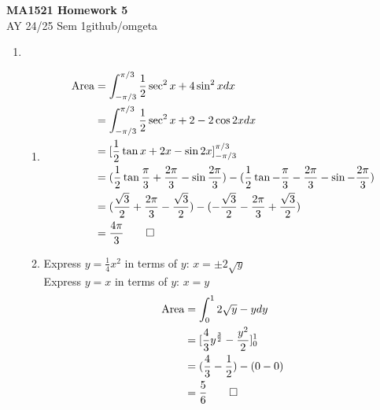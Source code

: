 \documentclass[12pt, a4paper]{article}
\newcommand{\mytitle}{MA1521 Homework 5}
\newcommand{\myauthor}{github/omgeta}
\newcommand{\mydate}{AY 24/25 Sem 1}
\begin{document}
\raggedright
\footnotesize
\begin{center}
{\normalsize{\textbf{\mytitle}}} \\
{\footnotesize{\mydate\hspace{2pt}\textemdash\hspace{2pt}\myauthor}}
\end{center}

\begin{enumerate}[Q\arabic*.]
  \item 
    \begin{enumerate}[(\alph*)]
      \item 
        \begin{align*}
          \text{Area} &= \int^{\pi/3}_{-\pi/3} \frac{1}{2}\sec^2x + 4\sin^2x dx\\
                      &= \int^{\pi/3}_{-\pi/3} \frac{1}{2}\sec^2x + 2 - 2\cos2x dx\\
                      &= [\frac{1}{2}\tan x + 2x - \sin 2x]^{\pi/3}_{-\pi/3}\\
                      &= (\frac{1}{2}\tan \frac{\pi}{3} + \frac{2\pi}{3} - \sin \frac{2\pi}{3}) - (\frac{1}{2}\tan -\frac{\pi}{3} - \frac{2\pi}{3} - \sin -\frac{2\pi}{3})\\
                      &= (\frac{\sqrt{3}}{2} + \frac{2\pi}{3} - \frac{\sqrt{3}}{2}) - (-\frac{\sqrt{3}}{2} - \frac{2\pi}{3} + \frac{\sqrt{3}}{2})\\
                      &= \frac{4\pi}{3} \qed
        \end{align*}

      \item Express $y=\frac{1}{4}x^2$ in terms of $y$: $x = \pm2\sqrt{y}$\\
        Express $y=x$ in terms of $y$: $x = y$
        \begin{align*}
          \text{Area} &= \int^1_0 2\sqrt{y} - y dy\\
                      &= [\frac{4}{3}y^{\frac{3}{2}} -\frac{y^2}{2}]^1_0\\
                      &= (\frac{4}{3} - \frac{1}{2}) - (0 - 0)\\
                      &= \frac{5}{6}\qed
        \end{align*}


\end{enumerate}
\end{enumerate}
\end{document}
